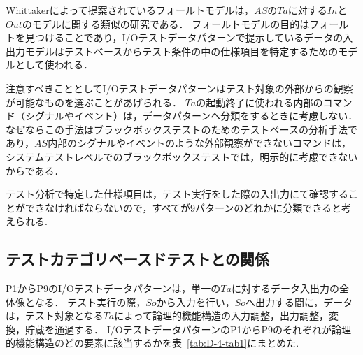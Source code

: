 Whittakerによって提案されているフォールトモデル\cite{whittaker2003break}は，$AS$の$Ta$に対する$In$と$Out$のモデルに関する類似の研究である．
フォールトモデルの目的はフォールトを見つけることであり，I/Oテストデータパターンで提示しているデータの入出力モデルはテストベースからテスト条件の中の仕様項目を特定するためのモデルとして使われる．


注意すべきこととしてI/Oテストデータパターンはテスト対象の外部からの観察が可能なものを選ぶことがあげられる．
$Ta$の起動終了に使われる内部のコマンド（シグナルやイベント）は，データパターンへ分類をするときに考慮しない．
なぜならこの手法はブラックボックステストのためのテストベースの分析手法であり，$AS$内部のシグナルやイベントのような外部観察ができないコマンドは，システムテストレベルでのブラックボックステストでは，明示的に考慮できないからである．

テスト分析で特定した仕様項目は，テスト実行をした際の入出力にて確認することができなければならないので，すべてが9パターンのどれかに分類できると考えられる.

\subsection{テストカテゴリベースドテストとの関係}

P1からP9のI/Oテストデータパターンは，単一の$Ta$に対するデータ入出力の全体像となる．
テスト実行の際，$So$から入力を行い，$So$へ出力する間に，データは，テスト対象となる$Ta$によって論理的機能構造の入力調整，出力調整，変換，貯蔵を通過する．
I/OテストデータパターンのP1からP9のそれぞれが論理的機能構造のどの要素に該当するかを表~\ref{tab:D-4-tab1}にまとめた.

